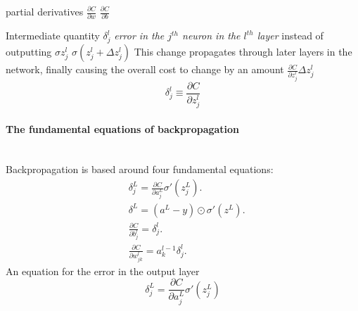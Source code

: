 \documentclass[10pt, a4paper, twocolumn]{article}
\newcommand{\myparagraph}[1]{\paragraph{#1}\mbox{}\\}
\begin{document}
			partial derivatives $\frac{\partial{C}}{\partial{w}}$ $\frac{\partial{C}}{\partial{b}}$
			
			
			
			
			Intermediate quantity $\delta_j^l$ \emph{error in the $j^{th}$ neuron in the $l^{th}$ layer}
			instead of outputting $\sigma{z_j^l}$ $\sigma(z_j^l + \Delta z_j^l)$ This change propagates through later layers in the network, finally causing the overall cost to change by an amount
			$\frac{\partial {C}}{\partial {z_j^l}}\Delta z_j^l$
			$$\delta_j^l\equiv \frac{\partial{C}}{\partial{z_j^l}}$$
			
			\myparagraph{The fundamental equations of backpropagation}
			Backpropagation is based around four fundamental equations:
			\begin{align}
			&\delta_j^L = \frac{\partial {C}}{\partial{a_j^L}}\sigma'(z_j^L). \tag{BP1}\\
			&\delta^L = (a^L-y) \odot \sigma'(z^L). \tag{BP2}\\
			&\frac{\partial C}{\partial b^l_j} = \delta^l_j.\tag{BP3}\\
			&\frac{\partial C}{\partial w^l_{jk}} = a^{l-1}_k \delta^l_j. \tag{BP4}
			\end{align}
			An equation for the error in the output layer
			$$\delta_j^L = \frac{\partial {C}}{\partial{a_j^L}}\sigma'(z_j^L)$$
			
\end{document}
